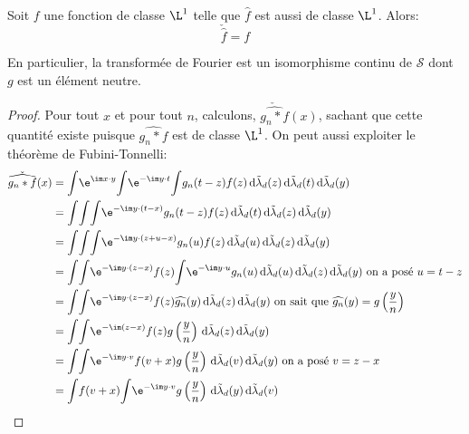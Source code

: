 \begin{theo}
Soit $f$ une fonction de classe $\L^1$ telle que $\widehat{f}$ est aussi de classe $\L^1$. Alors:
\[
\check{\widehat{f}} = f
\]

En particulier, la transformée de Fourier est un isomorphisme continu de $\mathcal{S}$ dont $g$ est un élément neutre.
\end{theo}

\begin{proof}
Pour tout $x$ et pour tout $n$, calculons, $\check{\widehat{g_n*f}}(x)$, sachant que cette quantité existe puisque $\widehat{g_n*f}$ est de classe $\L^1$. On peut aussi exploiter le théorème de Fubini-Tonnelli:
\begin{align*}
\check{\widehat{g_n*f}}(x) & = \displaystyle{\int} \e^{\im x \cdot y} \displaystyle{\int} \e^{-\im y \cdot t} \displaystyle{\int} g_n(t-z)f(z) \, \mathrm d \tilde{\lambda}_d(z) \, \mathrm d \tilde{\lambda}_d(t) \, \mathrm d \tilde{\lambda}_d(y) \\
 & = \displaystyle{\int} \displaystyle{\int} \displaystyle{\int} \e^{-\im y \cdot (t-x)} g_n(t-z)f(z) \, \mathrm d \tilde{\lambda}_d(t)\, \mathrm d \tilde{\lambda}_d(z) \, \mathrm d \tilde{\lambda}_d(y) \\ 
 & = \displaystyle{\int} \displaystyle{\int} \displaystyle{\int} \e^{-\im y \cdot (z+u-x)} g_n(u)f(z) \, \mathrm d \tilde{\lambda}_d(u) \, \mathrm d \tilde{\lambda}_d(z) \, \mathrm d \tilde{\lambda}_d(y) \\
 & = \displaystyle{\int} \displaystyle{\int} \e^{-\im y \cdot (z-x)} f(z) \displaystyle{\int} \e^{-\im y \cdot u} g_n(u) \, \mathrm d \tilde{\lambda}_d(u) \, \mathrm d \tilde{\lambda}_d(z) \, \mathrm d \tilde{\lambda}_d(y) \text{ on a posé }u=t-z \\ 
 & = \displaystyle{\int} \displaystyle{\int} \e^{-\im y \cdot (z-x)} f(z) \widehat{g_n}(y) \, \mathrm d \tilde{\lambda}_d(z) \, \mathrm d \tilde{\lambda}_d(y) \text{ on sait que }\widehat{g_n}(y) = g\left ( \frac{y}{n}\right ) \\  
 & = \displaystyle{\int} \displaystyle{\int} \e^{-\im (z-x)} f(z) g\left ( \frac{y}{n} \right ) \, \mathrm d \tilde{\lambda}_d(z) \, \mathrm d \tilde{\lambda}_d(y) \\ 
 & = \displaystyle{\int} \displaystyle{\int} \e^{-\im y \cdot v} f(v+x)  g\left ( \frac{y}{n} \right ) \, \mathrm d \tilde{\lambda}_d(v) \, \mathrm d \tilde{\lambda}_d(y) \text{ on a posé }v=z-x \\
 & = \displaystyle{\int}  f(v+x)  \displaystyle{\int} \e^{-\im y \cdot v} g\left ( \frac{y}{n} \right ) \, \mathrm d \tilde{\lambda}_d(y) \, \mathrm d \tilde{\lambda}_d(v) \\ 

\end{align*}
\end{proof}

